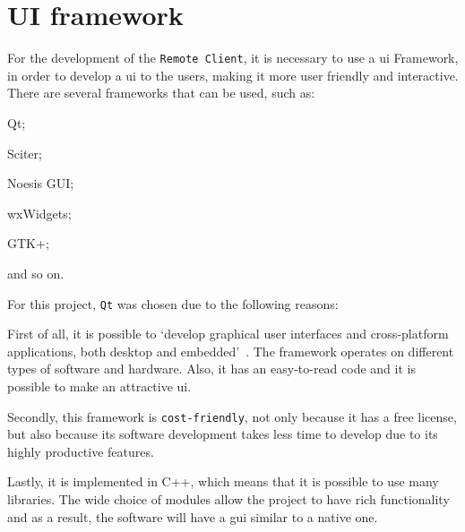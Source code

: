 %
\section{UI framework}
\label{sec:ui-framework}

For the development of the \texttt{Remote Client}, it is necessary to use a \gls{ui} Framework, in order to develop a \gls{ui} to the users, making it more user friendly and interactive.
There are several frameworks that can be used, such as:
%
\begin{item-c}
\item Qt;
\item Sciter;
\item Noesis GUI;
\item wxWidgets;
\item GTK+;
\item and so on.
\end{item-c}

For this project, \texttt{Qt} was chosen due to the following reasons:
\begin{item-c}
\item
  First of all, it is possible to `develop graphical user interfaces and cross-platform applications, both desktop and embedded'~\cite{qt-bib}.
The framework operates on different types of software and hardware.
Also, it has an easy-to-read code and it is possible to make an attractive
\gls{ui}.
\item 
Secondly, this framework is \texttt{cost-friendly}, not only because it has a
free license, but also because its software development takes less time to
develop due to its highly productive features.
\item
Lastly, it is implemented in C++, which means that it is possible to use many libraries.
The wide choice of modules allow the project to have rich functionality and as a result, the software will have a \gls{gui} similar to a native one.
\end{item-c}

